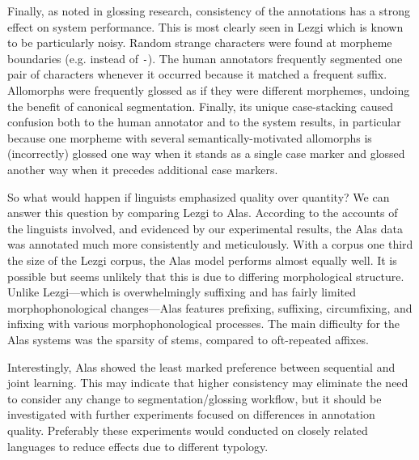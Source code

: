 Finally, as \citet{mcmillan-major_automating_2020} noted in glossing research, consistency of the annotations has a strong effect on system performance. This is most clearly seen in Lezgi which is known to be particularly noisy. Random strange characters were found at morpheme boundaries (e.g. {\tt *} instead of  {\tt -}). The human annotators frequently segmented one pair of characters whenever it occurred because it matched a frequent suffix. Allomorphs were frequently glossed as if they were different morphemes, undoing the benefit of canonical segmentation. Finally, its unique case-stacking caused confusion both to the human annotator and to the system results, in particular because one morpheme with several semantically-motivated allomorphs is (incorrectly) glossed one way when it stands as a single case marker and glossed another way when it precedes additional case markers.

So what would happen if linguists emphasized quality over quantity? We can answer this question by comparing Lezgi to Alas. According to the accounts of the linguists involved, and evidenced by our experimental results, the Alas data was annotated much more consistently and meticulously. With a corpus one third the size of the Lezgi corpus, the Alas model performs almost equally well. It is possible but seems unlikely that this is due to differing morphological structure. Unlike Lezgi---which is overwhelmingly suffixing and has fairly limited morphophonological changes---Alas features prefixing, suffixing, circumfixing, and infixing with various morphophonological processes. The main difficulty for the Alas systems was the sparsity of stems, compared to oft-repeated affixes. 

Interestingly, Alas showed the least marked preference between sequential and joint learning. This may indicate that higher consistency may eliminate the need to consider any change to segmentation/glossing workflow, but it should be investigated with further experiments focused on differences in annotation quality. Preferably these experiments would conducted on closely related languages to reduce effects due to different typology. 

